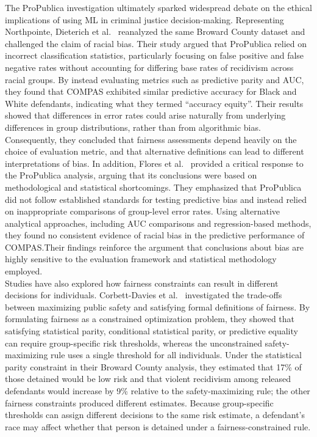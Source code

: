 \documentclass[12pt]{article}
\begin{document}
The ProPublica investigation ultimately sparked widespread debate on the ethical implications of using ML in criminal justice decision-making. Representing Northpointe, Dieterich et al.~\cite{dieterich2016compas} reanalyzed the same Broward County dataset and challenged the claim of racial bias. Their study argued that ProPublica relied on incorrect classification statistics, particularly focusing on false positive and false negative rates without accounting for differing base rates of recidivism across racial groups. By instead evaluating metrics such as predictive parity and AUC, they found that COMPAS exhibited similar predictive accuracy for Black and White defendants, indicating what they termed ``accuracy equity''. Their results showed that differences in error rates could arise naturally from underlying differences in group distributions, rather than from algorithmic bias. Consequently, they concluded that fairness assessments depend heavily on the choice of evaluation metric, and that alternative definitions can lead to different interpretations of bias. In addition, Flores et al.~\cite{flores2016false} provided a critical response to the ProPublica analysis, arguing that its conclusions were based on methodological and statistical shortcomings. They emphasized that ProPublica did not follow established standards for testing predictive bias and instead relied on inappropriate comparisons of group-level error rates. Using alternative analytical approaches, including AUC comparisons and regression-based methods, they found no consistent evidence of racial bias in the predictive performance of COMPAS.\@ Their findings reinforce the argument that conclusions about bias are highly sensitive to the evaluation framework and statistical methodology employed.\\

Studies have also explored how fairness constraints can result in different decisions for individuals. Corbett-Davies et al.~\cite{corbett2017algorithmic} investigated the trade-offs between maximizing public safety and satisfying formal definitions of fairness. By formulating fairness as a constrained optimization problem, they showed that satisfying statistical parity, conditional statistical parity, or predictive equality can require group-specific risk thresholds, whereas the unconstrained safety-maximizing rule uses a single threshold for all individuals. Under the statistical parity constraint in their Broward County analysis, they estimated that 17\% of those detained would be low risk and that violent recidivism among released defendants would increase by 9\% relative to the safety-maximizing rule; the other fairness constraints produced different estimates. Because group-specific thresholds can assign different decisions to the same risk estimate, a defendant's race may affect whether that person is detained under a fairness-constrained rule. 
\end{document}

